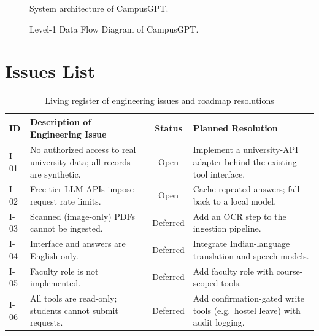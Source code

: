 \documentclass[11pt,a4paper,oneside]{report}
\begin{document}
\begin{figure}[H]
\centering
\resizebox{\textwidth}{!}{}
\caption{System architecture of CampusGPT.}
\label{fig:arch}
\end{figure}

\begin{figure}[H]
\centering
\resizebox{\textwidth}{!}{}
\caption{Level-1 Data Flow Diagram of CampusGPT.}
\label{fig:dfd}
\end{figure}

\chapter{Issues List}

\begin{table}[H]
\centering
\caption{Living register of engineering issues and roadmap resolutions}
\label{tab:issues}
\begin{tabularx}{\textwidth}{@{}lYcY@{}}
\toprule
\textbf{ID} & \textbf{Description of Engineering Issue} & \textbf{Status} &
\textbf{Planned Resolution}\\
\midrule
I-01 & No authorized access to real university data; all records are synthetic. & Open &
Implement a university-API adapter behind the existing tool interface.\\
I-02 & Free-tier LLM APIs impose request rate limits. & Open & Cache repeated answers;
fall back to a local model.\\
I-03 & Scanned (image-only) PDFs cannot be ingested. & Deferred & Add an OCR step to the
ingestion pipeline.\\
I-04 & Interface and answers are English only. & Deferred & Integrate Indian-language
translation and speech models.\\
I-05 & Faculty role is not implemented. & Deferred & Add faculty role with course-scoped
tools.\\
I-06 & All tools are read-only; students cannot submit requests. & Deferred & Add
confirmation-gated write tools (e.g.\ hostel leave) with audit logging.\\
\bottomrule
\end{tabularx}
\end{table}
\end{document}
